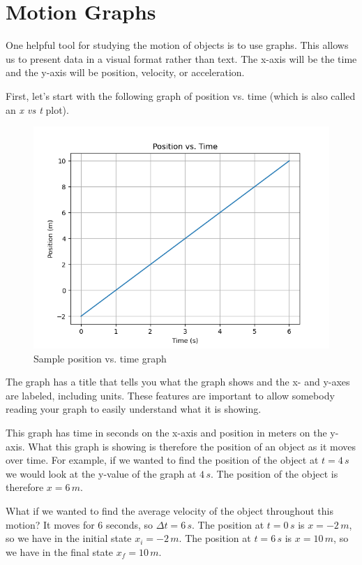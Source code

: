 \documentclass[12pt]{book}
\begin{document}
\section{Motion Graphs}

One helpful tool for studying the motion of objects is to use graphs. This allows us to present data in a visual format rather than text. The x-axis will be the time and the y-axis will be position, velocity, or acceleration.

First, let's start with the following graph of position vs. time (which is also called an \textit{x vs t} plot).

\begin{figure}[H]
\centering
\includegraphics[scale=0.6]{position1.png}
\caption{Sample position vs. time graph}
\label{pos1}
\end{figure}

The graph has a title that tells you what the graph shows and the x- and y-axes are labeled, including units. These features are important to allow somebody reading your graph to easily understand what it is showing. 

This graph has time in seconds on the x-axis and position in meters on the y-axis. What this graph is showing is therefore the position of an object as it moves over time. For example, if we wanted to find the position of the object at $t = 4 \, s$ we would look at the y-value of the graph at $4 \, s$. The position of the object is therefore $x = 6 \, m$.

What if we wanted to find the average velocity of the object throughout this motion? It moves for 6 seconds, so $\Delta t = 6 \, s$. The position at $t = 0 \, s$ is $x = -2 \, m$, so we have in the initial state $x_i = -2 \, m$. The position at $t = 6 \, s$ is $x = 10 \, m$, so we have in the final state $x_f = 10 \, m$.
\end{document}
